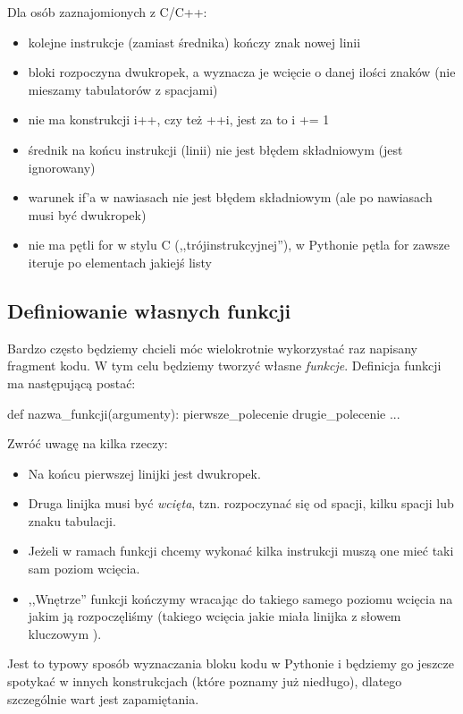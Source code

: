 \documentclass{pdfBooklets}
\begin{document}
\begin{teacherOnly}
\noindent Dla osób zaznajomionych z C/C++:
\begin{itemize}
\item kolejne instrukcje (zamiast średnika) kończy znak nowej linii
\item bloki rozpoczyna dwukropek, a wyznacza je wcięcie o danej ilości znaków (nie mieszamy tabulatorów z spacjami)
\item nie ma konstrukcji i++, czy też ++i, jest za to i += 1
\item średnik na końcu instrukcji (linii) nie jest błędem składniowym (jest ignorowany)
\item warunek if'a w nawiasach nie jest błędem składniowym (ale po nawiasach musi być dwukropek)
\item nie ma pętli for w stylu C (,,trójinstrukcyjnej''), w Pythonie pętla for zawsze iteruje po elementach jakiejś listy
\end{itemize}
\end{teacherOnly}

\subsection{Definiowanie własnych funkcji}

Bardzo często będziemy chcieli móc wielokrotnie wykorzystać raz napisany fragment kodu.
W tym celu będziemy tworzyć własne \emph{funkcje}. Definicja funkcji ma następującą postać:

\begin{CodeFrame*}[python]{}
def nazwa_funkcji(argumenty):
  pierwsze_polecenie
  drugie_polecenie
  ...
\end{CodeFrame*}

\noindent
Zwróć uwagę na kilka rzeczy:
\begin{itemize}
	\item Na końcu pierwszej linijki jest dwukropek.
	\item Druga linijka musi być \emph{wcięta}, tzn. rozpoczynać się od spacji, kilku spacji lub znaku tabulacji.
	\item Jeżeli w ramach funkcji chcemy wykonać kilka instrukcji muszą one mieć taki sam poziom wcięcia.
	\item ,,Wnętrze'' funkcji kończymy wracając do takiego samego poziomu wcięcia na jakim ją rozpoczęliśmy
	      (takiego wcięcia jakie miała linijka z słowem kluczowym ).
\end{itemize}\vspace{-4pt}
Jest to typowy sposób wyznaczania bloku kodu w Pythonie i będziemy go jeszcze spotykać w innych konstrukcjach (które poznamy już niedługo), dlatego szczególnie wart jest zapamiętania.
\end{document}
